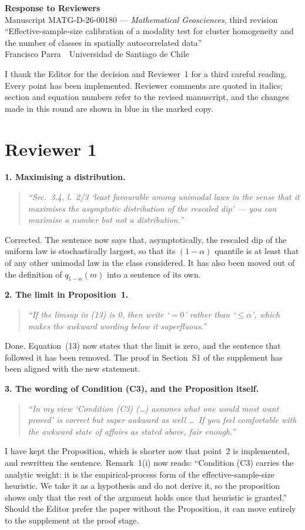 \documentclass[11pt]{article}
\newcommand{\R}[1]{\medskip\noindent\textbf{#1}\quad}
\newenvironment{rquote}{\begin{quote}\itshape}{\end{quote}}
\begin{document}
\begin{center}
{\LARGE\bfseries Response to Reviewers}\\[6pt]
{\large Manuscript MATG-D-26-00180 --- \emph{Mathematical Geosciences},
third revision}\\[4pt]
``Effective-sample-size calibration of a modality test for cluster homogeneity
and the number of classes in spatially autocorrelated data''\\[4pt]
Francisco Parra \,\textperiodcentered\, Universidad de Santiago de Chile
\end{center}
\medskip

I thank the Editor for the decision and Reviewer~1 for a third careful
reading. Every point has been implemented. Reviewer comments are quoted in
italics; section and equation numbers refer to the revised manuscript, and the
changes made in this round are shown in blue in the marked copy.

\section*{Reviewer 1}

\R{1. Maximising a distribution.}
\begin{rquote}
``Sec.~3.4, l.~2/3 `least favourable among unimodal laws in the sense that it
maximises the asymptotic distribution of the rescaled dip' --- you can
maximise a number but not a distribution.''
\end{rquote}
Corrected. The sentence now says that, asymptotically, the rescaled dip of the
uniform law is stochastically largest, so that its $(1-\alpha)$ quantile is at
least that of any other unimodal law in the class considered. It has also been
moved out of the definition of $q_{1-\alpha}(m)$ into a sentence of its own.

\R{2. The limit in Proposition~1.}
\begin{rquote}
``If the limsup in (13) is 0, then write `$=0$' rather than `$\le\alpha$',
which makes the awkward wording below it superfluous.''
\end{rquote}
Done. Equation~(13) now states that the limit is zero, and the sentence that
followed it has been removed. The proof in Section~S1 of the supplement has
been aligned with the new statement.

\R{3. The wording of Condition (C3), and the Proposition itself.}
\begin{rquote}
``In my view `Condition (C3) (\dots) assumes what one would most want proved'
is correct but super awkward as well \dots\ If you feel comfortable with the
awkward state of affairs as stated above, fair enough.''
\end{rquote}
I have kept the Proposition, which is shorter now that point~2 is
implemented, and rewritten the sentence. Remark~1(i) now reads: ``Condition
(C3) carries the analytic weight: it is the empirical-process form of the
effective-sample-size heuristic. We take it as a hypothesis and do not derive
it, so the proposition shows only that the rest of the argument holds once
that heuristic is granted.'' Should the Editor prefer the paper without the
Proposition, it can move entirely to the supplement at the proof stage.
\end{document}
